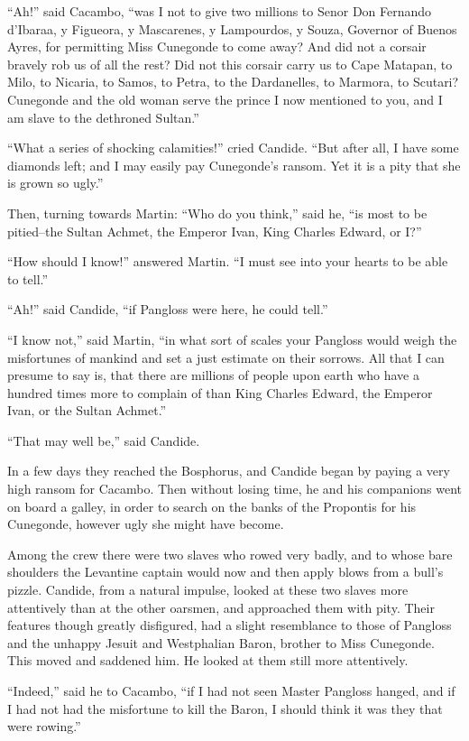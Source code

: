 ``Ah!'' said Cacambo, ``was I not to give two millions to Senor Don Fernando d'Ibaraa, y Figueora, y Mascarenes, y Lampourdos, y Souza, Governor of Buenos Ayres, for permitting Miss Cunegonde to come away? And did not a corsair bravely rob us of all the rest? Did not this corsair carry us to Cape Matapan, to Milo, to Nicaria, to Samos, to Petra, to the Dardanelles, to Marmora, to Scutari? Cunegonde and the old woman serve the prince I now mentioned to you, and I am slave to the dethroned Sultan.''

``What a series of shocking calamities!'' cried Candide. ``But after all, I have some diamonds left; and I may easily pay Cunegonde's ransom. Yet it is a pity that she is grown so ugly.''

Then, turning towards Martin: ``Who do you think,'' said he, ``is most to be pitied--the Sultan Achmet, the Emperor Ivan, King Charles Edward, or I?''

``How should I know!'' answered Martin. ``I must see into your hearts to be able to tell.''

``Ah!'' said Candide, ``if Pangloss were here, he could tell.''

``I know not,'' said Martin, ``in what sort of scales your Pangloss would weigh the misfortunes of mankind and set a just estimate on their sorrows. All that I can presume to say is, that there are millions of people upon earth who have a hundred times more to complain of than King Charles Edward, the Emperor Ivan, or the Sultan Achmet.''

``That may well be,'' said Candide.

In a few days they reached the Bosphorus, and Candide began by paying a very high ransom for Cacambo. Then without losing time, he and his companions went on board a galley, in order to search on the banks of the Propontis for his Cunegonde, however ugly she might have become.

Among the crew there were two slaves who rowed very badly, and to whose bare shoulders the Levantine captain would now and then apply blows from a bull's pizzle. Candide, from a natural impulse, looked at these two slaves more attentively than at the other oarsmen, and approached them with pity. Their features though greatly disfigured, had a slight resemblance to those of Pangloss and the unhappy Jesuit and Westphalian Baron, brother to Miss Cunegonde. This moved and saddened him. He looked at them still more attentively.

``Indeed,'' said he to Cacambo, ``if I had not seen Master Pangloss hanged, and if I had not had the misfortune to kill the Baron, I should think it was they that were rowing.''

